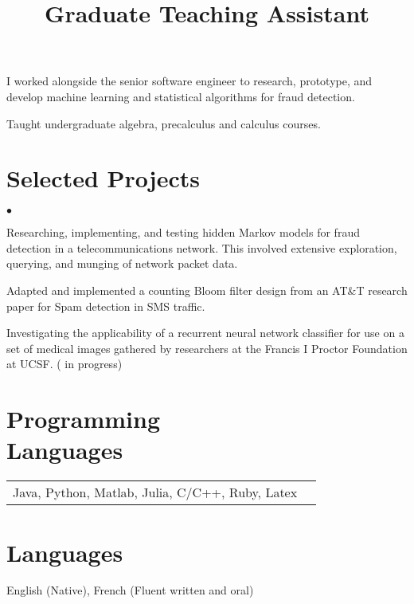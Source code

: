 \documentclass[margin,line,pifont,palatino,courier]{res}
\newenvironment{list2}{
  \begin{list}{$\bullet$}{%
      \setlength{\itemsep}{0in}
      \setlength{\parsep}{0in} \setlength{\parskip}{0in}
      \setlength{\topsep}{0in} \setlength{\partopsep}{0in}
      \setlength{\leftmargin}{0.2in}}}{\end{list}}
\begin{document}
\begin{resume}
\begin{position}
I worked alongside the senior software engineer to research, prototype, and develop machine learning and statistical algorithms for fraud detection.
\end{position}


 \title{Graduate Teaching Assistant} 

\begin{position}
Taught undergraduate algebra, precalculus and calculus courses. 
\end{position}




\section{\sc  Selected Projects}

\begin{list2}
  \item Researching, implementing, and testing hidden Markov models for fraud detection in a telecommunications network. This involved extensive exploration, querying, and munging of network packet data. 

  \item Adapted and implemented a counting Bloom filter design from an AT\&T research paper for Spam detection in SMS traffic.   

  \item Investigating the applicability of a recurrent neural network classifier for use on a set of medical images gathered by researchers at the Francis I Proctor Foundation at UCSF. ( in progress)
\end{list2}



\section{\sc Programming\\ Languages}

\begin{tabular}{@{}p{6in}p{3in}}

Java, Python, Matlab, Julia,  C/C++, Ruby, Latex \\


\end{tabular}


\section{\sc  Languages}
  English (Native), French (Fluent written and oral)



\end{resume}
\end{document}
